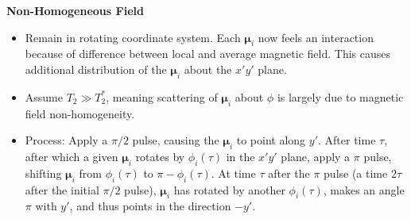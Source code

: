 \documentclass[11pt, a4paper]{article}
\renewcommand{\vec}[1]{\bm{#1}}
\newcommand{\m}{\vec{\mu}}  %
\begin{document}
\textbf{Non-Homogeneous Field}
\begin{itemize}
	\item Remain in rotating coordinate system. Each $ \m_{i} $ now feels an interaction because of difference between local and average magnetic field. This causes additional distribution of the $ \m_{i} $ about the $ x'y' $ plane.
	
	\item Assume $ T_{2} \gg T_{2}^{*}$, meaning scattering of $ \m_{i} $ about $ \phi $ is largely due to magnetic field non-homogeneity. 
	
	\item Process: Apply a $ \pi/2 $ pulse, causing the $ \m_{i} $ to point along $ y' $. After time $ \tau $, after which a given $ \m_{i} $ rotates by $ \phi_{i}(\tau) $ in the $ x'y' $ plane, apply a $ \pi $ pulse, shifting $ \m_{i} $ from $ \phi_{i}(\tau) $ to $ \pi - \phi_{i}(\tau) $. At time $ \tau $ after the $ \pi $ pulse (a time $ 2\tau $ after the initial $ \pi/2 $ pulse), $ \m_{i} $ has rotated by another $ \phi_{i}(\tau) $, makes an angle $ \pi $ with $ y' $, and thus points in the direction $ -y' $.
\end{itemize}
\end{document}
